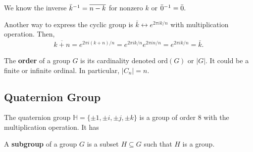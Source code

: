 \documentclass[a4paper]{article}
\begin{document}
We know the inverse $\bar k^{-1}=\overline{n-k}$ for nonzero $k$ or $\bar 0^{-1}=\bar 0.$

Another way to express the cyclic group is $\bar k\leftrightarrow e^{2\pi i k/n}$ with multiplication operation. Then, \begin{align}
    \overline{k+n}=e^{2\pi i (k+n)/n}=e^{2\pi i k/n}e^{2\pi i n/n}=e^{2\pi i k/n}=\bar k.
\end{align}

\begin{center}
\end{center}

\begin{definition}[Order]
    The \textbf{order} of a group $G$ is its cardinality denoted $\mathrm{ord}(G)$ or $|G|$. It could be a finite or infinite ordinal. In particular, $|C_n| = n$.
\end{definition}

\subsection{Quaternion Group}
The quaternion group $\mathbb{H}=\{\pm1,\pm i,\pm j,\pm k\}$ is a group of order $8$ with the multiplication operation. It has 

\begin{definition}[Subgroup]
    A \textbf{subgroup} of a group $G$ is a subset $H\subseteq G$ such that $H$ is a group. 
\end{definition}
\end{document}
